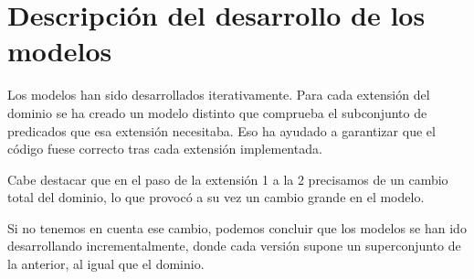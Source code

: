 \section{Descripción del desarrollo de los modelos}

Los modelos han sido desarrollados iterativamente. Para cada extensión
del dominio se ha creado un modelo distinto que comprueba el subconjunto
de predicados que esa extensión necesitaba. Eso ha ayudado a garantizar
que el código fuese correcto tras cada extensión implementada.

Cabe destacar que en el paso de la extensión
1 a la 2 precisamos de un cambio total del dominio, lo que provocó a su
vez un cambio grande en el modelo.

Si no tenemos en cuenta ese cambio, podemos concluir que los modelos se
han ido desarrollando incrementalmente, donde cada versión supone un 
superconjunto de la anterior, al igual que el dominio.

